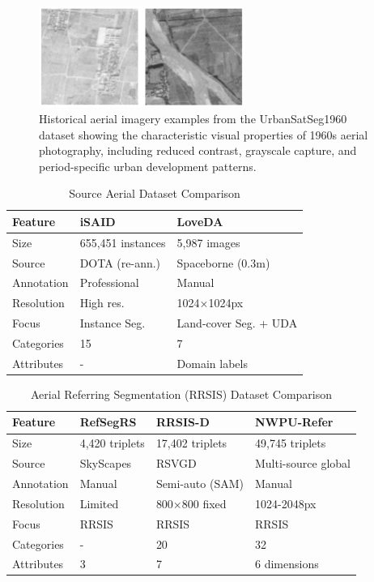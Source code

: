 \begin{figure}[htbp]
\centering
\includegraphics[width=0.6\textwidth]{Images/1960.png}
\caption{Historical aerial imagery examples from the UrbanSatSeg1960 dataset showing the characteristic visual properties of 1960s aerial photography, including reduced contrast, grayscale capture, and period-specific urban development patterns.}
\label{fig:historical_examples}
\end{figure}

\begin{table}[htbp]
\centering
\caption{Source Aerial Dataset Comparison}
\label{tab:source_comparison}
\begin{tabular}{@{}lll@{}}
\toprule
\textbf{Feature} & \textbf{iSAID} & \textbf{LoveDA} \\
\midrule
Size & 655,451 instances & 5,987 images \\
Source & DOTA (re-ann.) & Spaceborne (0.3m) \\
Annotation & Professional & Manual \\
Resolution & High res. & 1024×1024px \\
Focus & Instance Seg. & Land-cover Seg. + UDA \\
Categories & 15 & 7 \\
Attributes & - & Domain labels \\
\bottomrule
\end{tabular}
\end{table}

\begin{table}[htbp]
\centering
\caption{Aerial Referring Segmentation (RRSIS) Dataset Comparison}
\label{tab:rrsis_comparison}
\begin{tabular}{@{}llll@{}}
\toprule
\textbf{Feature} & \textbf{RefSegRS} & \textbf{RRSIS-D} & \textbf{NWPU-Refer} \\
\midrule
Size & 4,420 triplets & 17,402 triplets & 49,745 triplets \\
Source & SkyScapes & RSVGD & Multi-source global \\
Annotation & Manual & Semi-auto (SAM) & Manual \\
Resolution & Limited & 800×800 fixed & 1024-2048px \\
Focus & RRSIS & RRSIS & RRSIS \\
Categories & - & 20 & 32 \\
Attributes & 3 & 7 & 6 dimensions \\
\bottomrule
\end{tabular}
\end{table}


